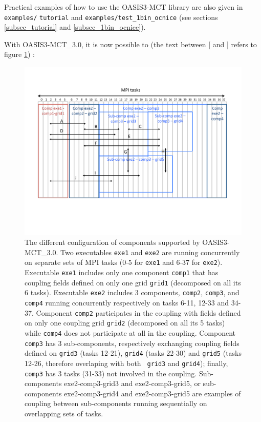 Practical examples of how to use the OASIS3-MCT library are also given in {\tt examples/} {\tt tutorial} and {\tt examples/test\_1bin\_ocnice} (see sections \ref{subsec_tutorial} and \ref{subsec_1bin_ocnice}). 

With OASIS3-MCT\_3.0, it is now possible to (the text between [ and ] refers to figure \ref{Fig_coupling_layouts_a}) :

\begin{figure}
  \includegraphics[scale=.6]{figures/coupling_layouts_a}
  \caption{The different configuration of components supported by OASIS3-MCT\_3.0. Two executables {\tt exe1} and {\tt exe2} are running concurrently on separate sets of MPI tasks (0-5 for {\tt exe1} and 6-37 for {\tt exe2}). Executable {\tt exe1} includes only one component {\tt comp1} that has coupling fields defined on only one grid {\tt grid1} (decomposed on all its 6 tasks). Executable {\tt exe2} includes 3 components, {\tt comp2}, {\tt comp3}, and {\tt comp4} running concurrently respectively on tasks 6-11, 12-33 and 34-37. Component {\tt comp2} participates in the coupling with fields defined on only one coupling grid {\tt grid2} (decomposed on all its 5 tasks) while {\tt comp4} does not participate at all in the coupling. 
Component {\tt comp3} has 3 sub-components, respectively exchanging
coupling fields defined on {\tt grid3} (tasks 12-21), {\tt grid4}
(tasks 22-30) and {\tt grid5} (tasks 12-26, therefore overlaping with both {\tt
  grid3} and {\tt grid4}); finally, {\tt comp3} has 3 tasks (31-33)
not involved in the coupling. Sub-components exe2-comp3-grid3 and
exe2-comp3-grid5, or sub-components exe2-comp3-grid4 and
exe2-comp3-grid5 are examples of coupling between sub-components running sequentially on overlapping sets of tasks.}
  \label{Fig_coupling_layouts_a}
\end{figure}

